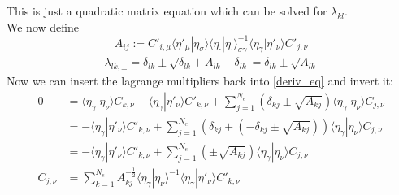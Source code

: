 This is just a quadratic matrix equation which can be solved for $\lambda_{kl}$.\\
We now define
\begin{equation}
    A_{ij}:= C'_{i,\mu} \langle \eta'_\mu|\eta_\sigma \rangle\langle \eta_\cdot|\eta_\cdot \rangle^{-1}_{\sigma\gamma} \langle \eta_\gamma|\eta'_\nu \rangle C'_{j,\nu}
\end{equation}
\begin{align}
    \lambda_{lk,\pm} = \delta_{lk} \pm \sqrt{\delta_{lk}+A_{lk}-\delta_{lk}} = \delta_{lk} \pm \sqrt{A_{lk}}
\end{align}
Now we can insert the lagrange multipliers back into \eqref{deriv_eq} and invert it:
\begin{align}
   0&=\langle \eta_\gamma|\eta_\nu \rangle C_{k,\nu} - \langle \eta_\gamma|\eta'_\nu \rangle C'_{k,\nu} + \sum\limits_{j=1}^{N_e} \left(\delta_{kj} \pm \sqrt{A_{kj}}\right) \langle \eta_\gamma|\eta_\nu \rangle  C_{j,\nu}\\
    &= - \langle \eta_\gamma|\eta'_\nu \rangle C'_{k,\nu} + \sum\limits_{j=1}^{N_e} \left(\delta_{kj}+\left(- \delta_{kj} \pm \sqrt{A_{kj}}\right)\right) \langle \eta_\gamma|\eta_\nu \rangle  C_{j,\nu}\\
    &= - \langle \eta_\gamma|\eta'_\nu \rangle C'_{k,\nu} + \sum\limits_{j=1}^{N_e} \left(\pm \sqrt{A_{kj}}\right) \langle \eta_\gamma|\eta_\nu \rangle  C_{j,\nu}\\
    C_{j,\nu}&= \sum\limits_{k=1}^{N_e}  A^{-\frac{1}{2}}_{kj} \langle \eta_\gamma|\eta_\nu \rangle^{-1} \langle \eta_\gamma|\eta'_\nu \rangle C'_{k,\nu}
\end{align}




